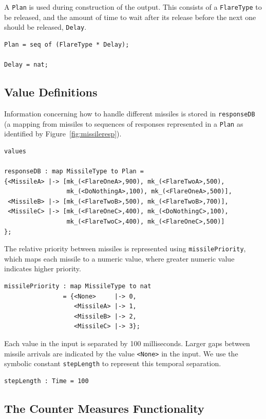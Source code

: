 \documentclass{overturerepchap}
\begin{document}
A \texttt{Plan} is used during construction of the output. This
consists of a \texttt{FlareType} to be released, and the amount of
time to wait after its release before the next one should be released,
\texttt{Delay}.

\begin{lstlisting}
Plan = seq of (FlareType * Delay);

Delay = nat;
\end{lstlisting}

\subsection{Value Definitions}

Information concerning how to handle different missiles is stored in
\texttt{responseDB} (a mapping from missiles to sequences of responses
represented in a \texttt{Plan} as identified by Figure~\ref{fig:missileresp}).

\begin{lstlisting}
values

responseDB : map MissileType to Plan =
{<MissileA> |-> [mk_(<FlareOneA>,900), mk_(<FlareTwoA>,500),
                 mk_(<DoNothingA>,100), mk_(<FlareOneA>,500)],
 <MissileB> |-> [mk_(<FlareTwoB>,500), mk_(<FlareTwoB>,700)],
 <MissileC> |-> [mk_(<FlareOneC>,400), mk_(<DoNothingC>,100),
                 mk_(<FlareTwoC>,400), mk_(<FlareOneC>,500)]
};
\end{lstlisting}

The relative priority between missiles is represented using
\texttt{missilePriority}, which maps each missile to a numeric value, where
greater numeric value indicates higher priority.

\begin{lstlisting}
missilePriority : map MissileType to nat
                = {<None>     |-> 0,
                   <MissileA> |-> 1,
                   <MissileB> |-> 2,
                   <MissileC> |-> 3};
\end{lstlisting}

Each value in the input is separated by 100 milliseconds. Larger gaps
between missile arrivals are indicated by the value \texttt{<None>} in
the input. We use the symbolic constant \texttt{stepLength} to
represent this temporal separation.

\begin{lstlisting}
stepLength : Time = 100
\end{lstlisting}

\subsection{The Counter Measures Functionality}
\end{document}
